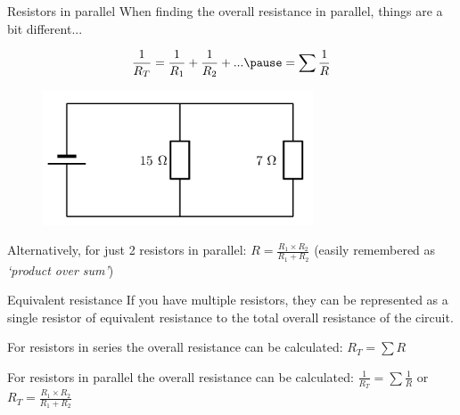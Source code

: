 \documentclass[../Main.tex]{subfiles}
\begin{document}
\begin{frame}{Resistors in parallel}
    When finding the overall resistance in parallel, things are a bit different... 
    
    \begin{equation*}
        \frac{1}{R_T}=\frac{1}{R_1}+\frac{1}{R_2}+... \pause 
        = \sum \frac{1}{R}
    \end{equation*}

\begin{figure}
    \centering
    \includegraphics[height=4cm]{Electricity_Images/parallel_circuit.png}
\end{figure}

Alternatively, for just 2 resistors in parallel: $R=\frac{R_1\times R_2}{R_1+R_2}$ (easily remembered as \emph{`product over sum'})
\end{frame}

\begin{frame}{Equivalent resistance}
If you have multiple resistors, they can be represented as a single resistor of equivalent resistance to the total overall resistance of the circuit. 
    \begin{multicols}{2}
    \begin{minipage}{5.5cm}
    \begin{block}{For resistors in series}
    the overall resistance can be calculated: \newline
    $R_T=\sum R$
    \end{block}
    \end{minipage}
    \columnbreak
    \begin{minipage}{5.5cm}
    \begin{block}{For resistors in parallel}
    the overall resistance can be calculated:\newline
    $\frac{1}{R_T}= \sum \frac{1}{R}$ or $R_T=\frac{R_1\times R_2}{R_1+R_2}$
    \end{block}
    \end{minipage}
    \end{multicols}
\end{frame}
\end{document}
